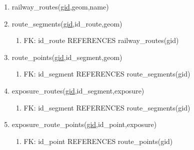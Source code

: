 	\begin{enumerate}
	\item railway\_routes(\underline{gid},geom,name)
	\item route\_segments(\underline{gid},id\_route,geom)
	\begin{enumerate}
		\item FK: id\_route REFERENCES railway\_routes(gid)  
	\end{enumerate} 
	\item route\_points(\underline{gid},id\_segment,geom)
	\begin{enumerate}
		\item FK: id\_segment REFERENCES route\_segments(gid)  
	\end{enumerate}
	\item exposure\_routes(\underline{gid},id\_segment,exposure)
	\begin{enumerate}
		\item FK: id\_segment REFERENCES route\_segments(gid)
	\end{enumerate}
	\item exposure\_route\_points(\underline{gid},id\_point,exposure)
	\begin{enumerate}
		\item FK: id\_point REFERENCES route\_points(gid)
	\end{enumerate}
\end{enumerate}
